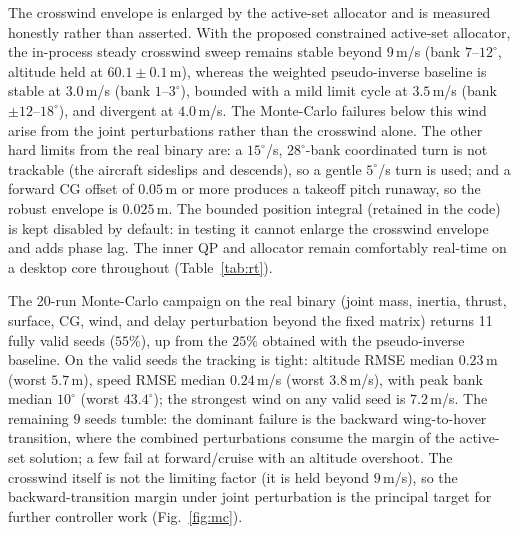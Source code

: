 \documentclass[preprint,3p,11pt]{elsarticle}
\begin{document}
The crosswind envelope is enlarged by the active-set allocator and is measured
honestly rather than asserted. With the proposed constrained active-set
allocator, the in-process steady crosswind sweep remains stable beyond
$9$\,m/s (bank $7$--$12^\circ$, altitude held at $60.1\pm0.1$\,m), whereas the
weighted pseudo-inverse baseline is stable at $3.0$\,m/s (bank $1$--$3^\circ$),
bounded with a mild limit cycle at $3.5$\,m/s (bank $\pm12$--$18^\circ$), and
divergent at $4.0$\,m/s. The Monte-Carlo failures below this wind arise from
the joint perturbations rather than the crosswind alone. The other hard limits
from the real binary are: a $15^\circ$/s,
$28^\circ$-bank coordinated turn is not trackable (the aircraft sideslips and
descends), so a gentle $5^\circ$/s turn is used; and a forward CG offset of
$0.05$\,m or more produces a takeoff pitch runaway, so the robust envelope is
$0.025$\,m. The bounded position integral (retained in the code) is kept
disabled by default: in testing it cannot enlarge the crosswind envelope and
adds phase lag. The inner QP and allocator remain comfortably real-time on a
desktop core throughout (Table~\ref{tab:rt}).

The 20-run Monte-Carlo campaign on the real binary (joint mass, inertia,
thrust, surface, CG, wind, and delay perturbation beyond the fixed matrix)
returns 11 fully valid seeds ($55\%$), up from the $25\%$ obtained with the
pseudo-inverse baseline. On the valid seeds the tracking is tight: altitude
RMSE median $0.23$\,m (worst $5.7$\,m), speed RMSE median $0.24$\,m/s (worst
$3.8$\,m/s), with peak bank median $10^\circ$ (worst $43.4^\circ$); the
strongest wind on any valid seed is $7.2$\,m/s. The remaining $9$ seeds tumble:
the dominant failure is the backward wing-to-hover transition, where the
combined perturbations consume the margin of the active-set solution; a few
fail at forward/cruise with an altitude overshoot. The crosswind itself is not
the limiting factor (it is held beyond $9$\,m/s), so the backward-transition
margin under joint perturbation is the principal target for further
controller work (Fig.~\ref{fig:mc}).
\end{document}
